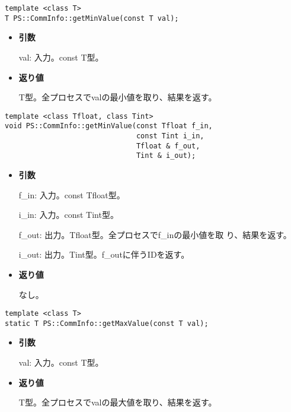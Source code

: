 \begin{screen}
\begin{verbatim}
template <class T>
T PS::CommInfo::getMinValue(const T val);
\end{verbatim}
\end{screen}

\begin{itemize}

\item{{\bf 引数}}

val: 入力。const T型。

\item{{\bf 返り値}}

T型。全プロセスでvalの最小値を取り、結果を返す。

\end{itemize}

\begin{screen}
\begin{verbatim}
template <class Tfloat, class Tint>
void PS::CommInfo::getMinValue(const Tfloat f_in,
                               const Tint i_in,
                               Tfloat & f_out,
                               Tint & i_out);
\end{verbatim}
\end{screen}

\begin{itemize}

\item{{\bf 引数}}

f\_in: 入力。const Tfloat型。

i\_in: 入力。const Tint型。

f\_out: 出力。Tfloat型。全プロセスでf\_inの最小値を取
り、結果を返す。

i\_out: 出力。Tint型。f\_outに伴うIDを返す。

\item{{\bf 返り値}}

なし。

\end{itemize}


\begin{screen}
\begin{verbatim}
template <class T>
static T PS::CommInfo::getMaxValue(const T val);
\end{verbatim}
\end{screen}

\begin{itemize}

\item{{\bf 引数}}

val: 入力。const T型。

\item{{\bf 返り値}}

T型。全プロセスでvalの最大値を取り、結果を返す。

\end{itemize}


